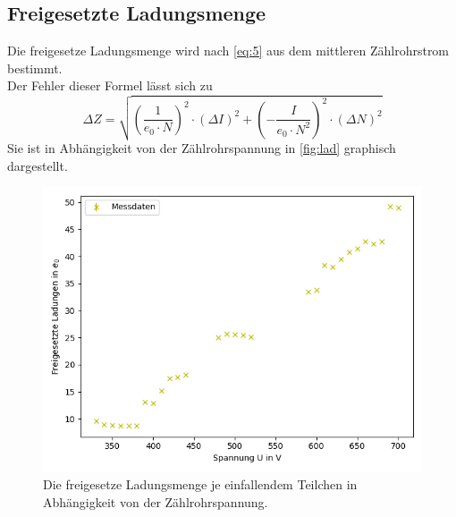 \subsection{Freigesetzte Ladungsmenge}

Die freigesetze Ladungsmenge wird nach \autoref{eq:5} aus dem mittleren Zählrohrstrom
bestimmt.\\
Der Fehler dieser Formel lässt sich zu %
\begin{equation*}
  \Delta Z = \sqrt{ ( \frac{1}{e_0 \cdot N} )^2 \cdot (\Delta I)^2 + (- \frac{I}{e_0 \cdot N^2})^2 \cdot (\Delta N)^2}
\end{equation*}
Sie ist in Abhängigkeit von der Zählrohrspannung in \autoref{fig:lad} graphisch dargestellt.\\
\begin{figure}[H]
  \centering
  \includegraphics{content/figure_2.png}
  \caption{Die freigesetze Ladungsmenge je einfallendem Teilchen in Abhängigkeit von der Zählrohrspannung.}
  \label{fig:lad}
\end{figure}


